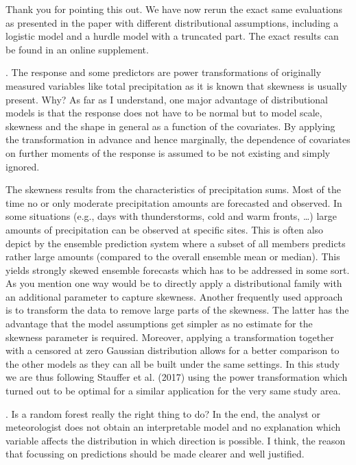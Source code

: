 \documentclass[american,foldmarks=false,noconfig]{uibklttr}
\newenvironment{review}{\fontshape{\itdefault}\fontseries{\bfdefault} \selectfont \smallskip}{\par}
\begin{document}
Thank you for pointing this out. We have now rerun the exact 
same evaluations as presented in the paper with different 
distributional assumptions, including a logistic model and 
a hurdle model with a truncated part. The exact results can be 
found in an online supplement.


\begin{review}
2. The response and some predictors are power transformations 
of originally measured variables like total precipitation as 
it is known that skewness is usually present. Why? As far as I 
understand, one major advantage of distributional models is
that the response does not have to be normal but to model scale, 
skewness and the shape in general as a function of the covariates. 
By applying the transformation in advance and hence marginally, 
the dependence of covariates on further moments of the response 
is assumed to be not existing and simply ignored.
\end{review}

The skewness results from the characteristics of precipitation sums. 
Most of the time no or only moderate precipitation amounts are forecasted 
and observed. In some situations (e.g., days with thunderstorms, cold and 
warm fronts, \dots) large amounts of precipitation can be observed at 
specific sites. This is often also depict by the ensemble prediction 
system where a subset of all members predicts rather large amounts 
(compared to the overall ensemble mean or median). This yields strongly 
skewed ensemble forecasts which has to be addressed in some sort.\\
As you mention one way would be to directly apply a
distributional family with an additional parameter to capture
skewness. Another frequently used approach is to transform the 
data to remove large parts of the skewness. The latter has the 
advantage that the model assumptions get simpler as no estimate 
for the skewness parameter is required. 
Moreover, applying a transformation together with a censored 
at zero Gaussian distribution allows for a better comparison 
to the other models as they can all be built under the same 
settings.
In this study we are thus following Stauffer et al. (2017) 
using the power transformation which turned out to be optimal 
for a similar application for the very same study area.


\begin{review}
3. Is a random forest really the right thing to do? In the 
end, the analyst or meteorologist does not obtain an 
interpretable model and no explanation which variable 
affects the distribution in which direction is possible. 
I think, the reason that focussing on predictions should 
be made clearer and well justified.
\end{review}
\end{document}
